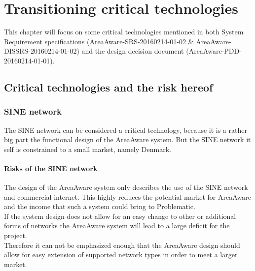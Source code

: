 %
\thispagestyle{fancy}
\chapter{Transitioning critical technologies}
\label{chp:trans_crit_tech}
This chapter will focus on some critical technologies mentioned in both System Requirement specifications (AreaAware-SRS-20160214-01-02 \& AreaAware-DISSRS-20160214-01-02) and the design decision document (AreaAware-PDD-20160214-01-01).

\section{Critical technologies and the risk hereof}
\subsection{SINE network}
The SINE network can be considered a critical technology, because it is a rather big part the functional design of the AreaAware system.
But the SINE network it self is constrained to a small market, namely Denmark.

\subsubsection{Risks of the SINE network}
The design of the AreaAware system only describes the use of the SINE network and commercial internet.
This highly reduces the potential market for AreaAware and the income that such a system could bring to Problematic.\\
If the system design does not allow for an easy change to other or additional forms of networks the AreaAware system will lead to a large deficit for the project.\\
Therefore it can not be emphasized enough that the AreaAware design should allow for easy extension of supported network types in order to meet a larger market.
